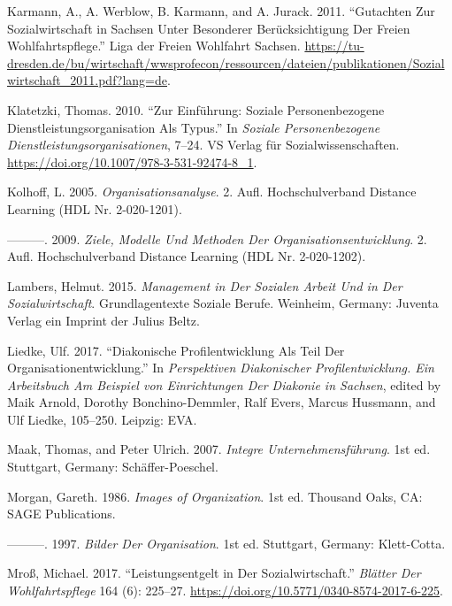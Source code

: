 \documentclass[
  letterpaper,
]{book}
\newlength{\cslhangindent}
\newenvironment{CSLReferences}[2] %
 {\begin{list}{}{%
  \setlength{\itemindent}{0pt}
  \setlength{\leftmargin}{0pt}
  \setlength{\parsep}{0pt}
  \ifodd #1
   \setlength{\leftmargin}{\cslhangindent}
   \setlength{\itemindent}{-1\cslhangindent}
  \fi
  \setlength{\itemsep}{#2\baselineskip}}}
 {\end{list}}
\begin{document}
\begin{CSLReferences}{1}{0}
Karmann, A., A. Werblow, B. Karmann, and A. Jurack. 2011. {``Gutachten
Zur Sozialwirtschaft in Sachsen Unter Besonderer Berücksichtigung Der
Freien Wohlfahrtspflege.''} Liga der Freien Wohlfahrt Sachsen.
\url{https://tu-dresden.de/bu/wirtschaft/wwsprofecon/ressourcen/dateien/publikationen/Sozialwirtschaft_2011.pdf?lang=de}.

Klatetzki, Thomas. 2010. {``Zur Einführung: Soziale Personenbezogene
Dienstleistungsorganisation Als Typus.''} In \emph{Soziale
Personenbezogene Dienstleistungsorganisationen}, 7--24. VS Verlag für
Sozialwissenschaften. \url{https://doi.org/10.1007/978-3-531-92474-8_1}.

Kolhoff, L. 2005. \emph{Organisationsanalyse}. 2. Aufl. Hochschulverband
Distance Learning (HDL Nr. 2-020-1201).

---------. 2009. \emph{Ziele, Modelle Und Methoden Der
Organisationsentwicklung}. 2. Aufl. Hochschulverband Distance Learning
(HDL Nr. 2-020-1202).

Lambers, Helmut. 2015. \emph{Management in Der Sozialen Arbeit Und in
Der Sozialwirtschaft}. Grundlagentexte Soziale Berufe. Weinheim,
Germany: Juventa Verlag ein Imprint der Julius Beltz.

Liedke, Ulf. 2017. {``Diakonische Profilentwicklung Als Teil Der
Organisationentwicklung.''} In \emph{Perspektiven Diakonischer
Profilentwicklung. Ein Arbeitsbuch Am Beispiel von Einrichtungen Der
Diakonie in Sachsen}, edited by Maik Arnold, Dorothy Bonchino-Demmler,
Ralf Evers, Marcus Hussmann, and Ulf Liedke, 105--250. Leipzig: EVA.

Maak, Thomas, and Peter Ulrich. 2007. \emph{Integre
Unternehmensf{ü}hrung}. 1st ed. Stuttgart, Germany: Sch{ä}ffer-Poeschel.

Morgan, Gareth. 1986. \emph{Images of Organization}. 1st ed. Thousand
Oaks, CA: SAGE Publications.

---------. 1997. \emph{Bilder Der Organisation}. 1st ed. Stuttgart,
Germany: Klett-Cotta.

Mroß, Michael. 2017. {``Leistungsentgelt in Der Sozialwirtschaft.''}
\emph{Blätter Der Wohlfahrtspflege} 164 (6): 225--27.
\url{https://doi.org/10.5771/0340-8574-2017-6-225}.


\end{CSLReferences}
\end{document}

